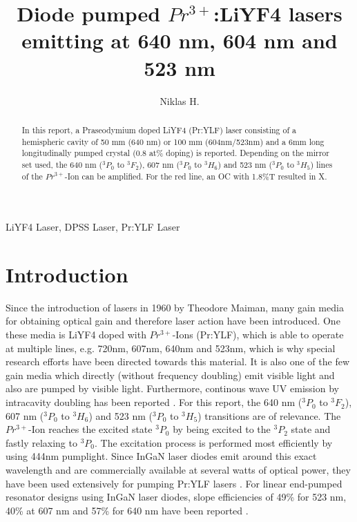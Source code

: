 \documentclass[conference]{IEEEtran}
\begin{document}
\title{Diode pumped $Pr^{3+}$:LiYF4 lasers emitting at 640 nm, 604 nm and 523 nm\\
}

\author{Niklas H.}

\maketitle

\begin{abstract}
In this report, a Praseodymium doped LiYF4 (Pr:YLF) laser consisting of a hemispheric cavity of 50 mm (640 nm) or 100 mm (604nm/523nm) and a 6mm long longitudinally pumped crystal (0.8 at\% doping) is reported. Depending on the mirror set used, the 640 nm ($^3P_0$ to $^3F_2$), 607 nm ($^3P_0$ to $^3H_6$) and 523 nm ($^3P_0$ to $^3H_5$) lines of the $Pr^{3+}$-Ion can be amplified. For the red line, an OC with 1.8\%T resulted in X.
\end{abstract}

\begin{IEEEkeywords}
LiYF4 Laser, DPSS Laser, Pr:YLF Laser
\end{IEEEkeywords}
\section{Introduction}

Since the introduction of lasers in 1960 by Theodore Maiman, many gain media for obtaining optical gain and therefore laser action have been introduced. One these media is LiYF4 doped with $Pr^{3+}$-Ions (Pr:YLF), which is able to operate at multiple lines, e.g. 720nm, 607nm, 640nm and 523nm, which is why special research efforts have been directed towards this material. It is also one of the few gain media which directly (without frequency doubling) emit visible light and also are pumped by visible light. Furthermore, continous wave UV emission by intracavity doubling has been reported \cite{Richter.2006}\cite{Gun.2011}. For this report, the 640 nm ($^3P_0$ to $^3F_2$), 607 nm ($^3P_0$ to $^3H_6$) and 523 nm ($^3P_0$ to $^3H_5$) transitions are of relevance. The $Pr^{3+}$-Ion reaches the excited state $^3P_0$ by being excited to the $^3P_2$ state and fastly relaxing to $^3P_0$. The excitation process is performed most efficiently by using 444nm pumplight. Since InGaN laser diodes emit around this exact wavelength and are commercially available at several watts of optical power, they have been used extensively for pumping Pr:YLF lasers \cite{Xu.2013}\cite{Krankel.2016}\cite{Bellancourt.2010}\cite{Luo.2018}\cite{Muller.2011}. For linear end-pumped resonator designs using InGaN laser diodes, slope efficiencies of 49\% for 523 nm, 40\% at 607 nm and 57\% for 640 nm have been reported \cite{Luo.2016}. 
\end{document}
